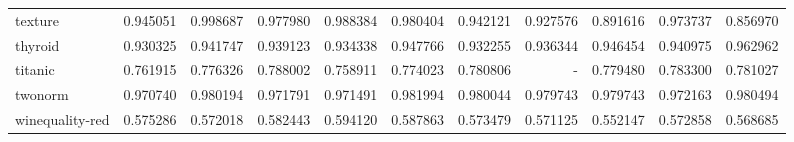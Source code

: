 \begin{tabular}{lrrrrrrrrrr}
texture         &   0.945051 &  0.998687 &  0.977980 &  0.988384 &  0.980404 &  0.942121 &  0.927576 &  0.891616 &  0.973737 &  0.856970 \\
thyroid         &   0.930325 &  0.941747 &  0.939123 &  0.934338 &  0.947766 &  0.932255 &  0.936344 &  0.946454 &  0.940975 &  0.962962 \\
titanic         &   0.761915 &  0.776326 &  0.788002 &  0.758911 &  0.774023 &  0.780806 &       - &  0.779480 &  0.783300 &  0.781027 \\
twonorm         &   0.970740 &  0.980194 &  0.971791 &  0.971491 &  0.981994 &  0.980044 &  0.979743 &  0.979743 &  0.972163 &  0.980494 \\
winequality-red &   0.575286 &  0.572018 &  0.582443 &  0.594120 &  0.587863 &  0.573479 &  0.571125 &  0.552147 &  0.572858 &  0.568685 \\
\bottomrule
\end{tabular}
